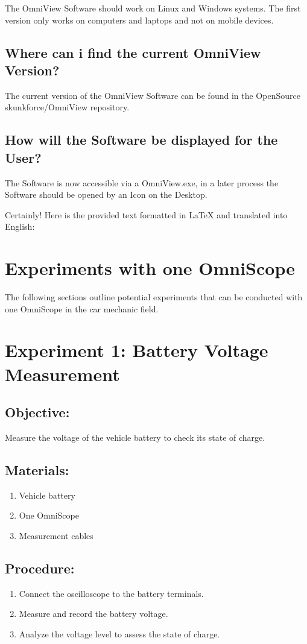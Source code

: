 \documentclass[]{scrreprt}
\begin{document}
    The OmniView Software should work on Linux and Windows systems. The first version only works on computers and laptops and not on mobile devices.


    \subsection{Where can i find the current OmniView Version?}


    The current version of the OmniView Software can be found in the OpenSource skunkforce/OmniView repository.


    \subsection{How will the Software be displayed for the User?}


    The Software is now accessible via a OmniView.exe, in a later process the Software should be opened by an Icon on the Desktop.


    Certainly! Here is the provided text formatted in LaTeX and translated into English:


    \section{Experiments with one OmniScope}
    The following sections outline potential experiments that can be conducted with one OmniScope in the car mechanic field.


    \section*{Experiment 1: Battery Voltage Measurement}
    \subsection*{Objective:} Measure the voltage of the vehicle battery to check its state of charge.
    \subsection*{Materials:}
    \begin{enumerate}
        \item Vehicle battery
        \item One OmniScope
        \item Measurement cables
    \end{enumerate}
    \subsection*{Procedure:}
    \begin{enumerate}
        \item Connect the oscilloscope to the battery terminals.
        \item Measure and record the battery voltage.
        \item Analyze the voltage level to assess the state of charge.
    \end{enumerate}
\end{document}
